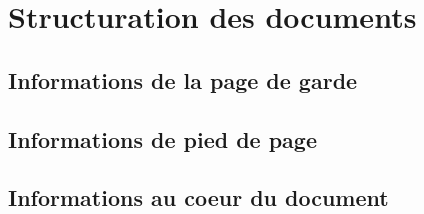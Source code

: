\section{Structuration des documents}
\subsection{Informations de la page de garde}
\subsection{Informations de pied de page}
\subsection{Informations au coeur du document}
